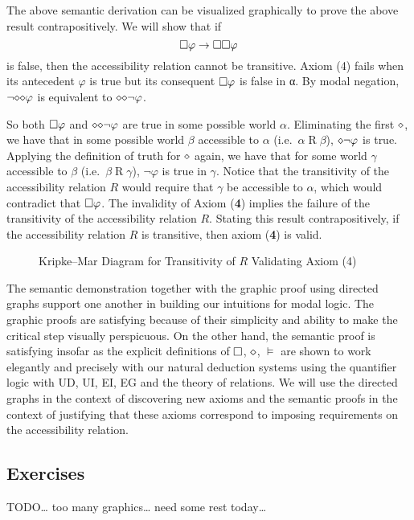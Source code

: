 \documentclass[
  12pt,
  letterpaper,
  DIV=11,
  numbers=noendperiod,
  twoside]{scrreprt}
\theoremstyle{remark}
\begin{document}
\phantom{a}

The above semantic derivation can be visualized graphically to prove the
above result contrapositively. We will show that if
\[{\small\square}\varphi\to{\small\square}{\small\square}\varphi\] is
false, then the accessibility relation cannot be transitive. Axiom (4)
fails when its antecedent \(\varphi\) is true but its consequent
\({\small\square}\varphi\) is false in α. By modal negation,
\(\neg{\Large\diamond}{\Large\diamond}\varphi\) is equivalent to
\({\Large\diamond}{\Large\diamond}\neg\varphi\).

So both \({\small\square}\varphi\) and
\({\Large\diamond}{\Large\diamond}\neg\varphi\) are true in some
possible world \(\alpha\). Eliminating the first \({\Large\diamond}\),
we have that in some possible world \(\beta\) accessible to \(\alpha\)
(i.e.~\(\alpha\mathbin{R}\beta\)), \({\Large\diamond}\neg\varphi\) is
true. Applying the definition of truth for \({\LARGE\diamond}\) again,
we have that for some world \(\gamma\) accessible to \(\beta\)
(i.e.~\(\beta\mathbin{R}\gamma\)), \(\neg\varphi\) is true in
\(\gamma\). Notice that the transitivity of the accessibility relation
\(R\) would require that \(\gamma\) be accessible to \(\alpha\), which
would contradict that \({\small\square}\varphi\). The invalidity of
Axiom (\textbf{4}) implies the failure of the transitivity of the
accessibility relation \(R\). Stating this result contrapositively, if
the accessibility relation \(R\) is transitive, then axiom (\textbf{4})
is valid.

\begin{figure}[H]


\caption{\label{fig-modal-kripke-worlds-diagram-transitivity-to-axiom-4}Kripke--Mar
Diagram for Transitivity of \(R\) Validating Axiom (4)}

\end{figure}%

The semantic demonstration together with the graphic proof using
directed graphs support one another in building our intuitions for modal
logic. The graphic proofs are satisfying because of their simplicity and
ability to make the critical step visually perspicuous. On the other
hand, the semantic proof is satisfying insofar as the explicit
definitions of \(\small\square\), \(\LARGE\diamond\), \(\vDash\) are
shown to work elegantly and precisely with our natural deduction systems
using the quantifier logic with UD, UI, EI, EG and the theory of
relations. We will use the directed graphs in the context of discovering
new axioms and the semantic proofs in the context of justifying that
these axioms correspond to imposing requirements on the accessibility
relation.

\subsection*{Exercises}\label{exercises-1}

TODO\ldots{} too many graphics\ldots{} need some rest today\ldots{}

\end{document}

